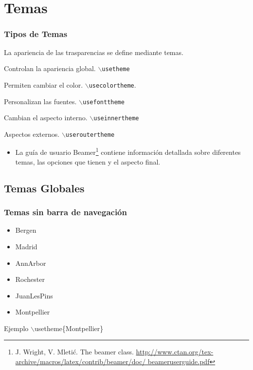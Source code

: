 \documentclass[aspectratio=43]{beamer}%
\begin{document}
\section{Temas}
\begin{frame}[fragile]
\frametitle{\textbf{Tipos de Temas}}
\justifying
 La apariencia de las trasparencias se define mediante temas.
\begin{description}\justifying
  \item[Globales] Controlan la apariencia global. \texttt{$\backslash$usetheme}
  \item[Color] Permiten cambiar el color. \texttt{$\backslash$usecolortheme}.
  \item[Fuentes] Personalizan las fuentes. \texttt{$\backslash$usefonttheme}
  \item[Internos] Cambian el aspecto interno. \texttt{$\backslash$useinnertheme}
  \item[Externos] Aspectos externos. \texttt{$\backslash$useroutertheme}
\end{description}
\begin{itemize}\justifying
  \item La guía de usuario Beamer\footnote{J. Wright, V. Mleti\'c. The beamer class. \url{http://www.ctan.org/tex-archive/macros/latex/contrib/beamer/doc/ beameruserguide.pdf}} contiene información detallada sobre diferentes temas, las opciones que tienen y el aspecto final.
\end{itemize}

\end{frame}

\subsection{Temas Globales}
\begin{frame}[fragile]
\frametitle{\textbf{Temas sin barra de navegación}}
\justifying
 \begin{itemize}\justifying
  \item Bergen
  \item Madrid
  \item AnnArbor
  \item Rochester
  \item JuanLesPins
  \item Montpellier
\end{itemize}
\begin{block}{Ejemplo}
$\backslash$usetheme\{Montpellier\}
\end{block}
\end{frame}
\end{document}
